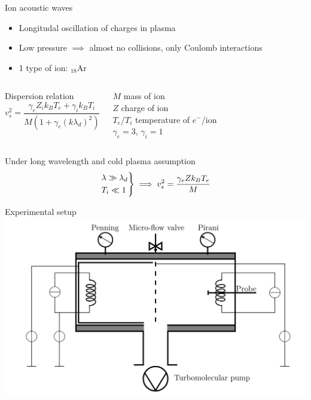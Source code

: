 \documentclass[10pt]{beamer}
\newcommand{\electron}[0]{$e^{-}$}
\begin{document}
\begin{frame}{Ion acoustic waves}
    \begin{itemize}
        \item Longitudal oscillation of charges in plasma
        \item Low pressure $\implies$ almost no collisions, only Coulomb interactions
        \item 1 type of ion: $_{18}$Ar
    \end{itemize}
    
    \vspace{0.5cm}
    \begin{columns}[T]
        Dispersion relation
        \begin{equation}
            v_s^2 = \frac{\gamma_e Z_i k_B T_e + \gamma_i k_B T_i}{M(1+\gamma_e(k\lambda_d)^2)}
        \end{equation}
        
        \vfill
        \centering
        $M$ mass of ion \\
        $Z$ charge of ion \\
        $T_e$/$T_i$ temperature of \electron/ion \\
        $\gamma_e=3$, $\gamma_i=1$
        \vfill
    \end{columns}

    \vspace{0.8cm}
    Under long wavelength and cold plasma assumption
    \begin{equation}
        \begin{rcases}
            \lambda \gg \lambda_d \\
            T_i \ll 1
        \end{rcases}
        \implies v_s^2 = \frac{\gamma_e Z k_B T_e}{M}
    \end{equation}
\end{frame}


\begin{frame}{Experimental setup}
    \includegraphics[width=\textwidth]{../figures/experimental_setup_Willemin_Zahar.png} 
\end{frame}
\end{document}
